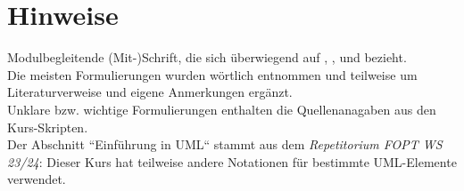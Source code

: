 \section*{Hinweise}
Modulbegleitende (Mit-)Schrift, die sich überwiegend auf \cite{Wed09}, \cite{Wed09b}, \cite{Buh09} und \cite{Wed09c} bezieht.\\
Die meisten Formulierungen wurden wörtlich entnommen und teilweise um Literaturverweise und eigene Anmerkungen ergänzt.\\
Unklare bzw. wichtige Formulierungen enthalten die Quellenanagaben aus den Kurs-Skripten.\\
Der Abschnitt ``Einführung in UML`` stammt aus dem \textit{Repetitorium FOPT WS 23/24}: Dieser Kurs hat teilweise andere Notationen für bestimmte UML-Elemente verwendet.